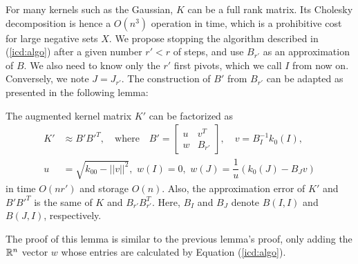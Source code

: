 For many kernels such as the Gaussian, $K$ can be a full rank matrix. Its Cholesky decomposition is hence a $O(n^3)$ operation in time, which is a prohibitive cost for large negative sets $X$. We propose stopping the algorithm described in (\ref{icd:algo}) after a given number $r'<r$ of steps, and use $B_{r'}$ as an approximation of $B$. We also need to know only the $r'$ first pivots, which we call $I$ from now on. Conversely, we note $J=J_{r'}$. The construction of $B'$ from $B_{r'}$ can be adapted as presented in the following lemma:
\begin{lemma}
The augmented kernel matrix $K'$ can be factorized as
\begin{align}
K'&\approx B'B'^T,\quad\text{where}\quad
B'=\begin{bmatrix} u & v^T\\w & B_{r'} \end{bmatrix},\quad
v=B_I^{-1} k_0(I),\\u&=\sqrt{k_{00}-||v||^2},\,\, w(I) = 0,\,\, w(J)=\dfrac{1}{u}(k_0(J)-B_Jv)
\end{align}
in time $O(nr')$ and storage $O(n)$. Also, the approximation error of $K'$ and $B'B'^T$ is the same of $K$ and $B_{r'}B_{r'}^T$. Here, $B_I$ and $B_J$ denote $B(I,I)$ and $B(J,I)$, respectively.
\end{lemma}
The proof of this lemma is similar to the previous lemma's proof, only adding the $\mathbb R^n$ vector $w$ whose entries are calculated by Equation (\ref{icd:algo}).
